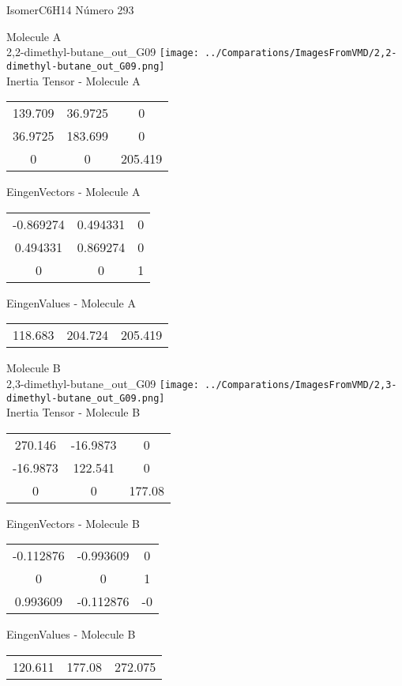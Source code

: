 \vtab[-2cm]
\begin{center}
{\large IsomerC6H14 \tab Número 293}
\end{center}
\begin{multicols}{2}
\begin{center}

Molecule A \\ 
2,2-dimethyl-butane\_out\_G09
\texttt{[image: ../Comparations/ImagesFromVMD/2,2-dimethyl-butane\_out\_G09.png]}
\\
Inertia Tensor - Molecule A \\
\vtab

\begin{tabular}{|c c c|}
139.709	 & 	36.9725	 & 	0	 \\
36.9725	 & 	183.699	 & 	0	 \\
0	 & 	0	 & 	205.419
\end{tabular}

\vtab
 EingenVectors - Molecule A     \\
\vtab
\begin{tabular}{|c c c|}
-0.869274	 & 	0.494331	 & 	0	 \\
0.494331	 & 	0.869274	 & 	0	 \\
0	 & 	0	 & 	1
\end{tabular}

\vtab
 EingenValues - Molecule A     \\
\vtab
\begin{tabular}{|c c c|}
118.683	 & 	204.724	 & 	205.419	 \\
\end{tabular}
\columnbreak

Molecule B \\ 
2,3-dimethyl-butane\_out\_G09
\texttt{[image: ../Comparations/ImagesFromVMD/2,3-dimethyl-butane\_out\_G09.png]}
\\
Inertia Tensor - Molecule B \\
\vtab

\begin{tabular}{|c c c|}
270.146	 & 	-16.9873	 & 	0	 \\
-16.9873	 & 	122.541	 & 	0	 \\
0	 & 	0	 & 	177.08
\end{tabular}

\vtab
 EingenVectors - Molecule B     \\
\vtab
\begin{tabular}{|c c c|}
-0.112876	 & 	-0.993609	 & 	0	 \\
0	 & 	0	 & 	1	 \\
0.993609	 & 	-0.112876	 & 	-0
\end{tabular}

\vtab
 EingenValues - Molecule B     \\
\vtab
\begin{tabular}{|c c c|}
120.611	 & 	177.08	 & 	272.075	 \\
\end{tabular}

\end{center}
\end{multicols}
